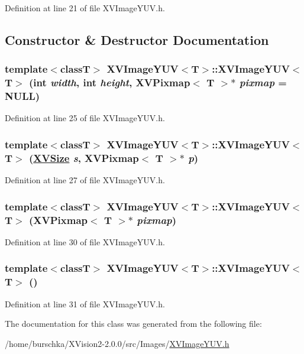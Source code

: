 Definition at line 21 of file XVImage\-YUV.h.

\subsection{Constructor \& Destructor Documentation}
\label{XVImageYUV_a0}
\hypertarget{class_XVImageYUV_a0}{
\subsubsection[XVImageYUV]{\setlength{\rightskip}{0pt plus 5cm}template$<$classT$>$ XVImage\-YUV$<$T$>$::XVImage\-YUV$<$T$>$ (int {\em width}, int {\em height}, XVPixmap$<$ T $>$$\ast$ {\em pixmap} = NULL)}}




Definition at line 25 of file XVImage\-YUV.h.\label{XVImageYUV_a1}
\hypertarget{class_XVImageYUV_a1}{
\subsubsection[XVImageYUV]{\setlength{\rightskip}{0pt plus 5cm}template$<$classT$>$ XVImage\-YUV$<$T$>$::XVImage\-YUV$<$T$>$ (\hyperlink{class_XVSize}{XVSize} {\em s}, XVPixmap$<$ T $>$$\ast$ {\em p})}}




Definition at line 27 of file XVImage\-YUV.h.\label{XVImageYUV_a2}
\hypertarget{class_XVImageYUV_a2}{
\subsubsection[XVImageYUV]{\setlength{\rightskip}{0pt plus 5cm}template$<$classT$>$ XVImage\-YUV$<$T$>$::XVImage\-YUV$<$T$>$ (XVPixmap$<$ T $>$$\ast$ {\em pixmap})}}




Definition at line 30 of file XVImage\-YUV.h.\label{XVImageYUV_a3}
\hypertarget{class_XVImageYUV_a3}{
\subsubsection[XVImageYUV]{\setlength{\rightskip}{0pt plus 5cm}template$<$classT$>$ XVImage\-YUV$<$T$>$::XVImage\-YUV$<$T$>$ ()}}




Definition at line 31 of file XVImage\-YUV.h.

The documentation for this class was generated from the following file:\begin{CompactItemize}
\item 
/home/burschka/XVision2-2.0.0/src/Images/\hyperlink{XVImageYUV.h-source}{XVImage\-YUV.h}\end{CompactItemize}
